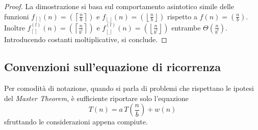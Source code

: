 \begin{proof}
    La dimostrazione si basa sul comportamento asintotico simile delle funzioni
    $f_{\left\lceil\right\rceil}(n)=\left(\left\lceil\frac{n}{b}\right\rceil\right)$
    e
    $f_{\left\lfloor\right\rfloor}(n)=\left(\left\lfloor\frac{n}{b}\right\rfloor\right)$
    rispetto a 
    $f(n)=\left(\frac{n}{b}\right)$. Inoltre 
    $f_{\left\lceil\right\rceil}^{(l)}(n)=\left(\left\lceil\frac{n}{b^l}\right\rceil\right)$
    e
    $f_{\left\lfloor\right\rfloor}^{(l)}(n)=\left(\left\lfloor\frac{n}{b^l}\right\rfloor\right)$
    entrambe $\Theta \left( \frac{n}{b^l} \right)$. Introducendo costanti moltiplicative, si conclude.
\end{proof}

\subsection{Convenzioni sull'equazione di ricorrenza}
Per comodità di notazione, quando si parla di problemi che rispettano le ipotesi del \textit{Master Theorem}, è sufficiente riportare solo l'equazione
\[
    T(n) = a \, T\left( \frac{n}{b} \right) + w(n)
\]
sfruttando le considerazioni appena compiute.

